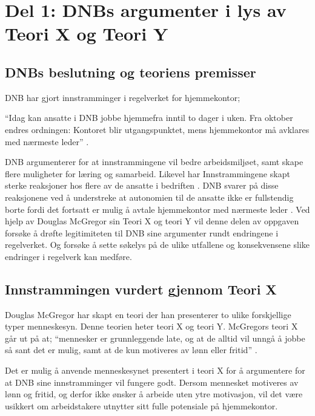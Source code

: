 \section{Del 1: DNBs argumenter i lys av Teori X og Teori Y}

\subsection{DNBs beslutning og teoriens premisser}

DNB har gjort innstramminger i regelverket for hjemmekontor; 

\enquote{Idag kan ansatte i DNB jobbe hjemmefra inntil to dager i uken. Fra oktober endres ordningen: Kontoret blir utgangspunktet, mens hjemmekontor må avklares med nærmeste leder} \parencite{biernat2026}.

DNB argumenterer for at innstrammingene vil bedre arbeidsmiljøet, samt skape flere muligheter for læring og samarbeid. Likevel har Innstrammingene skapt sterke reaksjoner hos flere av de ansatte i bedriften \parencite{biernat2026}. DNB svarer på disse reaksjonene ved å understreke at autonomien til de ansatte ikke er fullstendig borte fordi det fortsatt er mulig å avtale hjemmekontor med nærmeste leder \parencite{biernat2026}. Ved hjelp av Douglas McGregor sin Teori X og teori Y \parencite[s.~427]{einarsen2023} vil denne delen av oppgaven forsøke å drøfte legitimiteten til DNB sine argumenter rundt endringene i regelverket. Og forsøke å sette søkelys på de ulike utfallene og konsekvensene slike endringer i regelverk kan medføre.

\subsection{Innstrammingen vurdert gjennom Teori X}

Douglas McGregor har skapt en teori der han presenterer to ulike forskjellige typer menneskesyn. Denne teorien heter teori X og teori Y. McGregors teori X går ut på at; \enquote{mennesker er grunnleggende late, og at de alltid vil unngå å jobbe så sant det er mulig, samt at de kun motiveres av lønn eller fritid} \parencite[s.~427]{einarsen2023}.

Det er mulig å anvende menneskesynet presentert i teori X for å argumentere for at DNB sine innstramminger vil fungere godt. Dersom mennesket motiveres av lønn og fritid, og derfor ikke ønsker å arbeide uten ytre motivasjon, vil det være usikkert om arbeidstakere utnytter sitt fulle potensiale på hjemmekontor.

